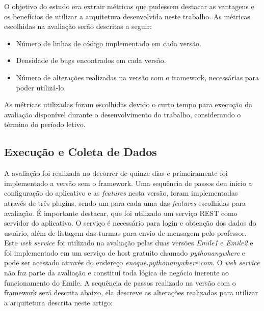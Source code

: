 O objetivo do estudo era extrair métricas que pudessem destacar as vantagens e os benefícios de utilizar a arquitetura desenvolvida neste trabalho. As métricas escolhidas na avaliação serão descritas a seguir:

\begin{itemize}
	\item Número de linhas de código implementado em cada versão.

	\item Densidade de bugs encontrados em cada versão.

	\item Número de alterações realizadas na versão com o framework, necessárias para poder utilizá-lo.
\end{itemize}

As métricas utilizadas foram escolhidas devido o curto tempo para execução da avaliação disponível durante o desenvolvimento do trabalho, considerando o término do período letivo.

\subsection{Execução e Coleta de Dados}
A avaliação foi realizada no decorrer de quinze dias e primeiramente foi implementado a versão sem o framework. Uma sequência de passos deu início a configuração do aplicativo e as \textit{features} nesta versão, foram implementadas através de três plugins, sendo um para cada uma das \textit{features} escolhidas para avaliação. É importante destacar, que foi utilizado um serviço REST  como servidor do aplicativo. O serviço é necessário para login e obtenção dos dados do usuário, além de listagem das turmas para envio de mensagem pelo professor. Este \textit{web service} foi utilizado na avaliação pelas duas versões \textit{Emile1} e \textit{Emile2} e foi implementado em um serviço de host gratuito chamado \textit{pythonanywhere} e pode ser acessado através do endereço \textit{enoque.pythonanywhere.com}. O \textit{web service} não faz parte da avaliação e constitui toda lógica de negócio inerente ao funcionamento do Emile. A sequência de passos realizado na versão com o framework será descrita abaixo, ela descreve as alterações realizadas para utilizar a arquitetura descrita neste artigo:

